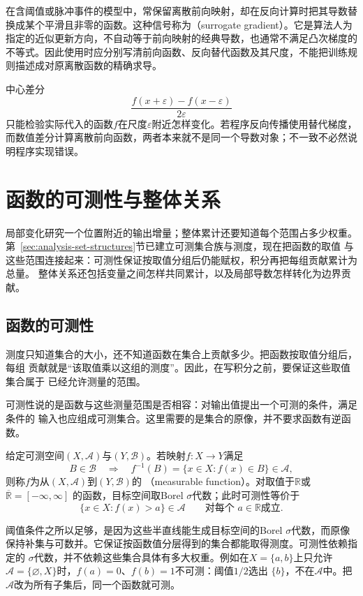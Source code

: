 在含阈值或脉冲事件的模型中，常保留离散前向映射，却在反向计算时把其导数替换成某个平滑且非零的函数。这种信号称为（surrogate gradient）。它是算法人为指定的近似更新方向，不自动等于前向映射的经典导数，也通常不满足凸次梯度的不等式。因此使用时应分别写清前向函数、反向替代函数及其尺度，不能把训练规则描述成对原离散函数的精确求导。

中心差分
\[   \frac{f(x+\varepsilon)-f(x-\varepsilon)}{2\varepsilon} \]
只能检验实际代入的函数$f$在尺度$\varepsilon$附近怎样变化。若程序反向传播使用替代梯度，而数值差分计算离散前向函数，两者本来就不是同一个导数对象；不一致不必然说明程序实现错误。

\section{函数的可测性与整体关系}
\label{sec:analysis-integration-average}

局部变化研究一个位置附近的输出增量；整体累计还要知道每个范围占多少权重。
第~\ref{sec:analysis-set-structures}节已建立可测集合族与测度，现在把函数的取值
与这些范围连接起来：可测性保证按取值分组后仍能赋权，积分再把每组贡献累计为总量。
整体关系还包括变量之间怎样共同累计，以及局部导数怎样转化为边界贡献。

\subsection{函数的可测性}

测度只知道集合的大小，还不知道函数在集合上贡献多少。把函数按取值分组后，每组
贡献就是“该取值乘以这组的测度”。因此，在写积分之前，要保证这些取值集合属于
已经允许测量的范围。

可测性说的是函数与这些测量范围是否相容：对输出值提出一个可测的条件，满足条件的
输入也应组成可测集合。这里需要的是集合的原像，并不要求函数有逆函数。
\begin{definition}[可测函数]
\label{def:analysis-measurable-function}
给定可测空间$(X,\mathcal{A})$与$(Y,\mathcal{B})$。若映射$f:X\to Y$满足
\[
  B\in\mathcal{B}\quad\Longrightarrow\quad
  f^{-1}(B)=\{x\in X:f(x)\in B\}\in\mathcal{A},
\]
则称$f$为从$(X,\mathcal{A})$到$(Y,\mathcal{B})$的
（measurable function）。对取值于$\mathbb{R}$或$\overline{\mathbb{R}}=[-\infty,\infty]$
的函数，目标空间取Borel $\sigma$代数；此时可测性等价于
\[
  \{x\in X:f(x)>a\}\in\mathcal{A}
  \qquad\text{对每个 }a\in\mathbb{R}\text{成立}.
\]
\end{definition}
阈值条件之所以足够，是因为这些半直线能生成目标空间的Borel $\sigma$代数，而原像
保持补集与可数并。它保证按函数值分层得到的集合都能取得测度。可测性依赖指定的
$\sigma$代数，并不依赖这些集合具体有多大权重。例如在$X=\{a,b\}$上只允许
$\mathcal{A}=\{\varnothing,X\}$时，$f(a)=0$、$f(b)=1$不可测：阈值$1/2$选出
$\{b\}$，不在$\mathcal{A}$中。把$\mathcal{A}$改为所有子集后，同一个函数就可测。

